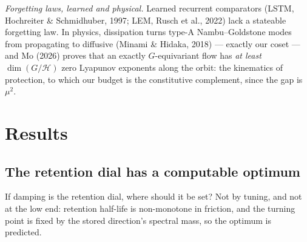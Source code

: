 {\emph{Forgetting laws, learned and physical.} Learned recurrent comparators (LSTM, Hochreiter \& Schmidhuber, 1997; LEM, Rusch et al., 2022) lack a stateable forgetting law. In physics, dissipation turns type-A Nambu--Goldstone modes from propagating to diffusive (Minami \& Hidaka, 2018) --- exactly our coset --- and Mo (2026) proves that an exactly $G$-equivariant flow has \emph{at least} $\dim(G/\mathcal H)$ zero Lyapunov exponents along the orbit: the kinematics of protection, to which our budget is the constitutive complement, since the gap is $\mu^2$.\par}

\section{Results}\label{sec:results}

\subsection{The retention dial has a computable optimum}\label{sec:vcurve}

If damping is the retention dial, where should it be set? Not by tuning, and not at the low end: retention half-life is non-monotone in friction, and the turning point is fixed by the stored direction's spectral mass, so the optimum is predicted.

